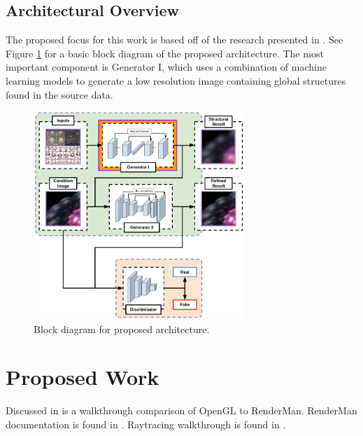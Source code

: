 \documentclass[conference]{IEEEtran}
\begin{document}
\cite{backwards_raytrace}
\cite{arnold}
\cite{renderman}

\subsection{Architectural Overview}
\label{sec:architecture}
The proposed focus for this work is based off of the research presented in
\cite{pose_guided}.
See Figure \ref{fig:block_diagram} for a basic block diagram of the proposed architecture.
The most important component
is Generator I, which uses a combination of machine learning models to generate a
low resolution image containing global structures found in the
source data.

\begin{figure}[htbp]
\centerline{\includegraphics[width=8cm]{block_diagram.png}}
\caption{Block diagram for proposed architecture.}
\label{fig:block_diagram}
\end{figure}

\section{Proposed Work}
\label{sec:proposed_work}
Discussed in \cite{renderman_opengl} is a walkthrough comparison of OpenGL to RenderMan.
RenderMan documentation is found in \cite{renderman_docs}.
Raytracing walkthrough is found in \cite{raytrace_walkthrough}.
\end{document}
